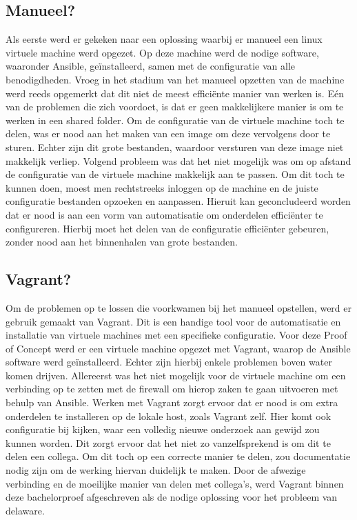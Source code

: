 \subsection{Manueel?}
Als eerste werd er gekeken naar een oplossing waarbij er manueel een linux virtuele machine werd opgezet. Op deze machine werd de nodige software, waaronder Ansible, geïnstalleerd, samen met de configuratie van alle benodigdheden. Vroeg in het stadium van het manueel opzetten van de machine werd reeds opgemerkt dat dit niet de meest efficiënte manier van werken is. Eén van de problemen die zich voordoet, is dat er geen makkelijkere manier is om te werken in een shared folder. Om de configuratie van de virtuele machine toch te delen, was er nood aan het maken van een image om deze vervolgens door te sturen. Echter zijn dit grote bestanden, waardoor versturen van deze image niet makkelijk verliep. Volgend probleem was dat het niet mogelijk was om op afstand de configuratie van de virtuele machine makkelijk aan te passen. Om dit toch te kunnen doen, moest men rechtstreeks inloggen op de machine en de juiste configuratie bestanden opzoeken en aanpassen. Hieruit kan geconcludeerd worden dat er nood is aan een vorm van automatisatie om onderdelen efficiënter te configureren. Hierbij moet het delen van de configuratie efficiënter gebeuren, zonder nood aan het binnenhalen van grote bestanden.
\subsection{Vagrant?}
Om de problemen op te lossen die voorkwamen bij het manueel opstellen, werd er gebruik gemaakt van Vagrant. Dit is een handige tool voor de automatisatie en installatie van virtuele machines met een specifieke configuratie. Voor deze Proof of Concept werd er een virtuele machine opgezet met Vagrant, waarop de Ansible software werd geïnstalleerd. Echter zijn hierbij enkele problemen boven water komen drijven. 
\newline
\newline
Allereerst was het niet mogelijk voor de virtuele machine om een verbinding op te zetten met de firewall om hierop zaken te gaan uitvoeren met behulp van Ansible. Werken met Vagrant zorgt ervoor dat er nood is om extra onderdelen te installeren op de lokale host, zoals Vagrant zelf. Hier komt ook configuratie bij kijken, waar een volledig nieuwe onderzoek aan gewijd zou kunnen worden. Dit zorgt ervoor dat het niet zo vanzelfsprekend is om dit te delen een collega. Om dit toch op een correcte manier te delen, zou documentatie nodig zijn om de werking hiervan duidelijk te maken. Door de afwezige verbinding en de moeilijke manier van delen met collega's, werd Vagrant binnen deze bachelorproef afgeschreven als de nodige oplossing voor het probleem van delaware.

